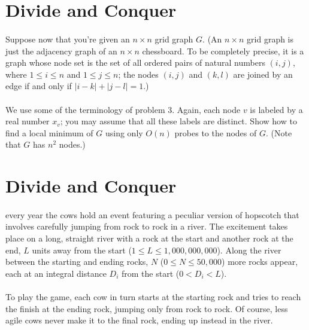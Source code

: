 \documentclass[a4paper,11pt]{article}
\begin{document}
\section{Divide and Conquer}

\paragraph{}Suppose now that you're given an $n\times n$ grid graph $G$. (An $n\times n$ grid graph is just the adjacency graph of an $n \times n$ chessboard. To be completely precise, it is a graph whose node set is the set of all ordered pairs of natural numbers $(i,j)$, where $1\leqslant i\leqslant n$ and $1\leqslant j\leqslant n$; the nodes $(i,j)$ and $(k,l)$ are joined by an edge if and only if $|i-k|+|j-l|=1$.)

\paragraph{}We use some of the terminology of problem 3. Again, each node $v$ is labeled by a real number $x_v$; you may assume that all these labels are distinct. Show how to find a local minimum of $G$ using only $O(n)$ probes to the nodes of $G$. (Note that $G$ has $n^2$ nodes.)

\section{Divide and Conquer}

\paragraph{}every year the cows hold an event featuring a peculiar version of hopscotch that involves carefully jumping from rock to rock in a river. The excitement takes place on a long, straight river with a rock at the start and another rock at the end, $L$ units away from the start ($1 \leq L \leq 1,000,000,000$). Along the river between the starting and ending rocks, $N$ ($0 \leq N \leq 50,000$) more rocks appear, each at an integral distance $D_i$ from the start ($0 < D_i < L$).

\paragraph{}To play the game, each cow in turn starts at the starting rock and tries to reach the finish at the ending rock, jumping only from rock to rock. Of course, less agile cows never make it to the final rock, ending up instead in the river.
\end{document}
